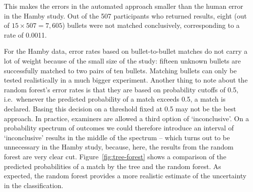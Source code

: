 \documentclass[aoas, preprint]{imsart}\usepackage[]{graphicx}\usepackage[]{color}
\newcommand{\hh}[1]{{\color{magenta} #1}}
\begin{document}
This makes the errors in the automated approach smaller than the human error in the Hamby study. Out of the 507 participants who returned results, eight (out of $15 \times 507 = 7,605$) bullets were not matched conclusively, corresponding to a rate of 0.0011. 

For the Hamby data, error rates based on bullet-to-bullet matches do not carry a lot of weight because of the small size of the study: fifteen unknown bullets are successfully matched to two pairs of ten bullets. Matching bullets can only be tested realistically in a much bigger experiment. 
Another thing to note about  the random forest's error rates is that they are based on probability cutoffs of 0.5, i.e.\ whenever the predicted probability of a match exceeds 0.5, a match is declared. Basing this decision on a threshold fixed at 0.5 may not be the best approach. In practice, examiners are allowed a third option of `inconclusive'. On a probability spectrum of outcomes we could therefore introduce an interval of `inconclusive' results in the middle of the spectrum -- which turns out to be unnecessary in the Hamby study, because, here, the results from the random forest are very clear cut. Figure~\ref{fig:tree-forest} shows a comparison of the predicted probabilities of a match by the tree and the random forest. As expected, the random forest provides a more realistic estimate of the uncertainty in the classification. %
\end{document}
